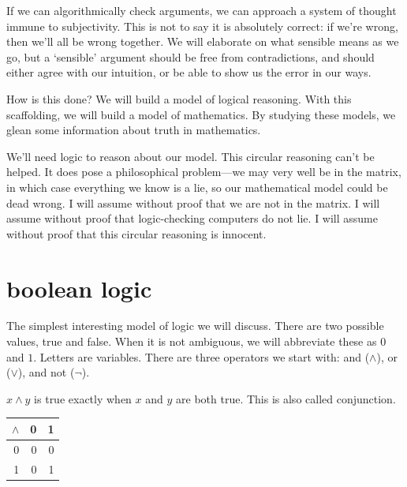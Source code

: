 \message{ !name(truth.tex)}\documentclass{scrbook}
\begin{document}
If we can algorithmically check arguments, we can approach a system of thought immune to subjectivity. This is not to say it is absolutely correct: if we're wrong, then we'll all be wrong together. We will elaborate on what sensible means as we go, but a `sensible' argument should be free from contradictions, and should either agree with our intuition, or be able to show us the error in our ways. 

How is this done? 
We will build a model of logical reasoning. With this scaffolding, we will build a model of mathematics. By studying these models, we glean some information about truth in mathematics. 


We'll need logic to reason about our model. This circular reasoning can't be helped. It does pose a philosophical problem---we may very well be in the matrix, in which case everything we know is a lie, so our mathematical model could be dead wrong. I will assume without proof that we are not in the matrix. I will assume without proof that logic-checking computers do not lie. I will assume without proof that this circular reasoning is innocent. 
\chapter[Boolean Logic]{boolean logic}
The simplest interesting model of logic we will discuss. There are two possible values, true and false. When it is not ambiguous, we will abbreviate these as $0$ and $1$. Letters are variables. There are three operators we start with: and ($\wedge$), or ($\vee$), and not ($\neg$). 
\begin{defn}
  \label{def:bool:and}
  $x \wedge y$ is true exactly when $x$ and $y$ are both true. This is also called conjunction.
  \begin{center}
    \begin{tabular}{r|rr}
      $\wedge$ & 0 & 1 \\
      \hline
      0 & 0 & 0 \\
      1 & 0 & 1 
    \end{tabular}
  \end{center}
\end{defn}
\end{document}
